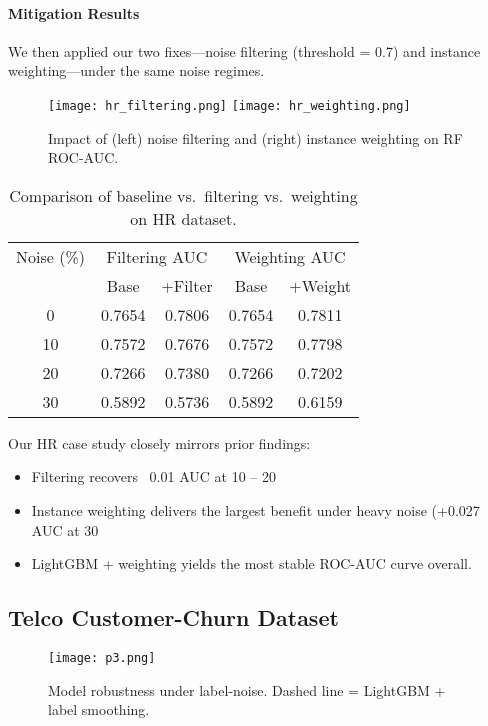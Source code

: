 \documentclass[conference]{IEEEtran}
\begin{document}
\paragraph{Mitigation Results}
We then applied our two fixes—noise filtering (threshold = 0.7) and instance weighting—under the same noise regimes.

\begin{figure}[H]
  \centering
  \texttt{[image: hr\_filtering.png]}
  \texttt{[image: hr\_weighting.png]}
  \caption{Impact of (left) noise filtering and (right) instance weighting on RF ROC-AUC.}
  \label{fig:hr-mitigations}
\end{figure}

\begin{table}[H]
  \centering
  \small
  \begin{tabular}{c|cc|cc}
    \hline
    Noise (\%) 
      & \multicolumn{2}{c|}{Filtering AUC} 
      & \multicolumn{2}{c}{Weighting AUC} \\ 
    \cline{2-5}
      & Base & +Filter    & Base & +Weight   \\
    \hline
      0 & 0.7654 & 0.7806 & 0.7654 & 0.7811 \\
     10 & 0.7572 & 0.7676 & 0.7572 & 0.7798 \\
     20 & 0.7266 & 0.7380 & 0.7266 & 0.7202 \\
     30 & 0.5892 & 0.5736 & 0.5892 & 0.6159 \\
    \hline
  \end{tabular}
  \caption{Comparison of baseline vs.\ filtering vs.\ weighting on HR dataset.}
  \label{tab:hr-mitigation}
\end{table}

Our HR case study closely mirrors prior findings:
\begin{itemize}
  \item Filtering recovers ~0.01 AUC at 10 – 20 %
  \item Instance weighting delivers the largest benefit under heavy noise (+0.027 AUC at 30 %
  \item LightGBM + weighting yields the most stable ROC-AUC curve overall.
\end{itemize}

\subsection{Telco Customer-Churn Dataset}
\begin{figure}[H]
  \centering
  \texttt{[image: p3.png]}
  \caption{Model robustness under label-noise. Dashed line = LightGBM + label smoothing.}
  \label{fig:roc_auc}
\end{figure}
\end{document}
